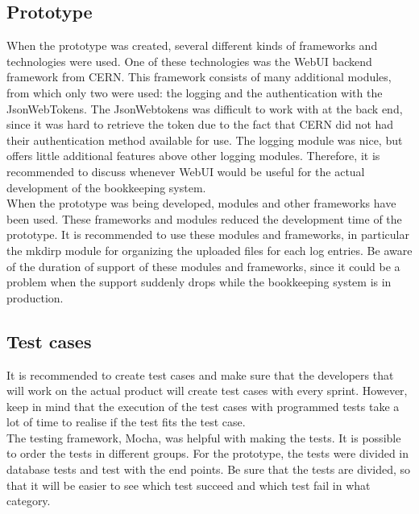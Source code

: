 \documentclass[paper=a4, fontsize=11pt,twoside]{scrartcl}	%
\begin{document}
\newpage
\subsection{Prototype}
When the prototype was created, several different kinds of frameworks and technologies were used. One of these technologies was the WebUI backend framework from CERN. This framework consists of many additional modules, from which only two were used: the logging and the authentication with the JsonWebTokens. The JsonWebtokens was difficult to work with at the back end, since it was hard to retrieve the token due to the fact that CERN did not had their authentication method available for use. The logging module was nice, but offers little additional features above other logging modules. Therefore, it is recommended to discuss whenever WebUI would be useful for the actual development of the bookkeeping system. \\
When the prototype was being developed, modules and other frameworks have been used. These frameworks and modules reduced the development time of the prototype. It is recommended to use these modules and frameworks, in particular the mkdirp module for organizing the uploaded files for each log entries. Be aware of the duration of support of these modules and frameworks, since it could be a problem when the support suddenly drops while the bookkeeping system is in production. \\


\subsection{Test cases}
It is recommended to create test cases and make sure that the developers that will work on the actual product will create test cases with every sprint. However, keep in mind that the execution of the test cases with programmed tests take a lot of time to realise if the test fits the test case. \\
The testing framework, Mocha, was helpful with making the tests. It is possible to order the tests in different groups. For the prototype, the tests were divided in database tests and test with the end points. Be sure that the tests are divided, so that it will be easier to see which test succeed and which test fail in what category.

\newpage
\end{document}
